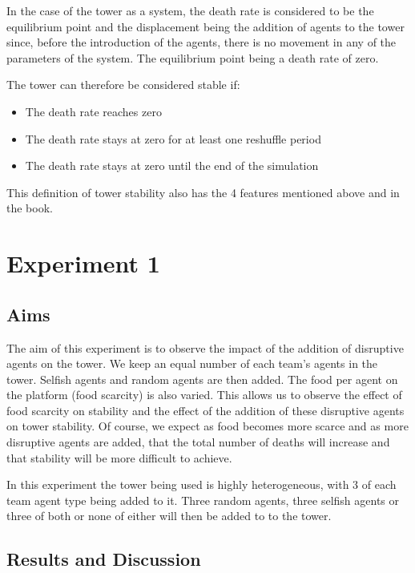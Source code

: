 In the case of the tower as a system, the death rate is considered to be the equilibrium point and the displacement being the addition of agents to the tower since, before the introduction of the agents, there is no movement in any of the parameters of the system. The equilibrium point being a death rate of zero. 

The tower can therefore be considered stable if:
\begin{itemize}
    \item The death rate reaches zero
    \item The death rate stays at zero for at least one reshuffle period
    \item The death rate stays at zero until the end of the simulation
\end{itemize}
 
This definition of tower stability also has the 4 features mentioned above and in the book.

\section{Experiment 1}
\label{sec: Experiment 1}
\subsection{Aims}
\label{subsec: E1-Aims}
The aim of this experiment is to observe the impact of the addition of disruptive agents on the tower. 
We keep an equal number of each team’s agents in the tower. Selfish agents and random agents are then added. The food per agent on the platform (food scarcity) is also varied. This allows us to observe the effect of food scarcity on stability and the effect of the addition of these disruptive agents on tower stability. Of course, we expect as food becomes more scarce and as more disruptive agents are added, that the total number of deaths will increase and that stability will be more difficult to achieve.

In this experiment the tower being used is highly heterogeneous, with 3 of each team agent type being added to it. Three random agents, three selfish agents or three of both or none of either will then be added to to the tower.
\subsection{Results and Discussion}
\label{subsec: E1-Results and Discussion}

